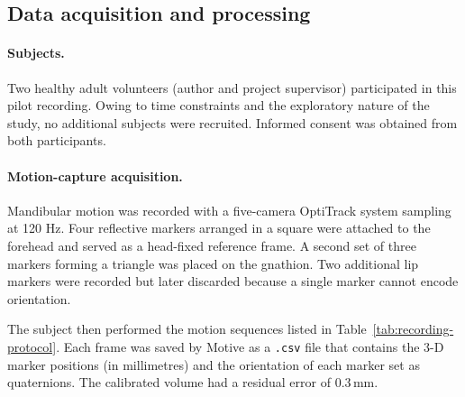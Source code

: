 \subsection{Data acquisition and processing}
\label{sec:motion-capture}

\paragraph{Subjects.} 
Two healthy adult volunteers (author and project supervisor) participated in this pilot recording. Owing to time constraints and the exploratory 
nature of the study, no additional subjects were recruited. Informed consent was obtained from both participants.

\paragraph{Motion-capture acquisition.}
Mandibular motion was recorded with a five-camera OptiTrack system sampling at 120 Hz.
Four reflective markers arranged in a square were attached to the forehead and served as a head-fixed reference frame.
A second set of three markers forming a triangle was placed on the gnathion.
Two additional lip markers were recorded but later discarded because a single marker cannot encode orientation. \cite{motion_capture_adult,motion_capture_children}

The subject then performed the motion sequences listed in Table~\ref{tab:recording-protocol}. Each frame was saved by Motive as a \texttt{.csv} file that contains
the 3-D marker positions (in millimetres) and the orientation of each marker set as quaternions. The calibrated volume had a residual error of $0.3\,$mm.

